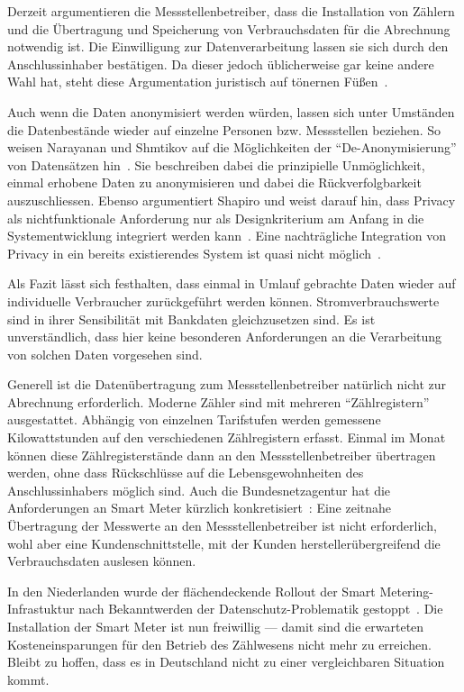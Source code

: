 \documentclass[12pt,BCOR=8.5mm]{scrartcl}
\begin{document}
Derzeit argumentieren die Messstellenbetreiber, dass die Installation
von Zählern und die Übertragung und Speicherung von Verbrauchsdaten für
die Abrechnung notwendig ist. Die Einwilligung zur Datenverarbeitung
lassen sie sich durch den Anschlussinhaber bestätigen. Da dieser jedoch
üblicherweise gar keine andere Wahl hat, steht diese Argumentation
juristisch auf tönernen Füßen~\cite{karg10rahmenbedingungen}. 

Auch wenn die Daten anonymisiert werden würden, lassen sich unter
Umständen die Datenbestände wieder auf einzelne Personen bzw.
Messstellen beziehen. So weisen Narayanan und Shmtikov auf die Möglichkeiten der
``De-Anonymisierung'' von Datensätzen hin~\cite{narayanan2010pii}. Sie
beschreiben dabei die prinzipielle Unmöglichkeit, einmal erhobene Daten
zu anonymisieren und dabei die Rückverfolgbarkeit auszuschliessen.
Ebenso argumentiert Shapiro und weist darauf hin, dass Privacy als
nichtfunktionale Anforderung nur als Designkriterium am Anfang in die
Systementwicklung integriert werden kann~\cite{shapiro2010privacy}. Eine
nachträgliche Integration von Privacy in ein bereits existierendes
System ist quasi nicht möglich~\cite{cavoukian2010smartprivacy}.

Als Fazit lässt sich festhalten, dass einmal in Umlauf gebrachte Daten
wieder auf individuelle Verbraucher zurückgeführt werden können.
Stromverbrauchswerte sind in ihrer Sensibilität mit Bankdaten
gleichzusetzen sind. Es ist unverständlich, dass hier keine besonderen
Anforderungen an die Verarbeitung von solchen Daten vorgesehen sind.

Generell ist die Datenübertragung zum Messstellenbetreiber natürlich
nicht zur Abrechnung erforderlich. Moderne Zähler sind mit mehreren
"`Zählregistern"' ausgestattet. Abhängig von einzelnen Tarifstufen
werden gemessene Kilowattstunden auf den verschiedenen Zählregistern
erfasst. Einmal im Monat können diese Zählregisterstände dann an den
Messstellenbetreiber übertragen werden, ohne dass Rückschlüsse auf die
Lebensgewohnheiten des Anschlussinhabers möglich sind. Auch die
Bundesnetzagentur hat die Anforderungen an Smart Meter kürzlich
konkretisiert~\cite{bundesnetzagentur10position}: Eine zeitnahe Übertragung der Messwerte an den
Messstellenbetreiber ist nicht erforderlich, wohl aber eine
Kundenschnittstelle, mit der Kunden herstellerübergreifend die
Verbrauchsdaten auslesen können.

In den Niederlanden wurde der flächendeckende
Rollout der Smart Metering-Infrastuktur nach Bekanntwerden der
Datenschutz-Problematik gestoppt~\cite{nrc09compulsory}. Die
Installation der Smart Meter ist nun freiwillig --- damit sind die
erwarteten Kosteneinsparungen für den Betrieb des Zählwesens nicht mehr
zu erreichen.  Bleibt zu hoffen, dass es in Deutschland nicht zu einer
vergleichbaren Situation kommt.
\end{document}
